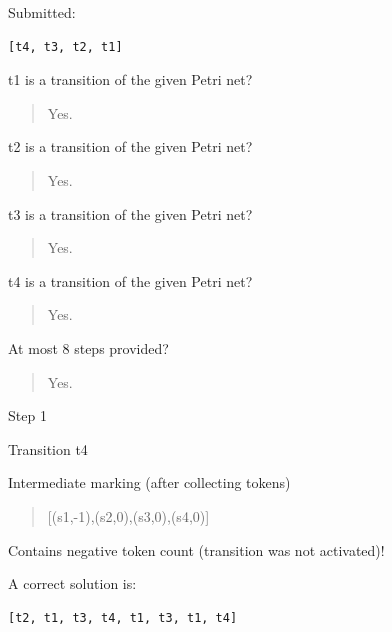 Submitted:


\begin{verbatim}
[t4, t3, t2, t1]
\end{verbatim}


t1 is a transition of the given Petri net?\begin{quote}Yes.\end{quote}t2 is a transition of the given Petri net?\begin{quote}Yes.\end{quote}t3 is a transition of the given Petri net?\begin{quote}Yes.\end{quote}t4 is a transition of the given Petri net?\begin{quote}Yes.\end{quote}At most 8 steps provided?\begin{quote}Yes.\end{quote}Step 1

 Transition t4 

Intermediate marking (after collecting tokens)

\begin{quote} [(s1,-1),(s2,0),(s3,0),(s4,0)] \end{quote}Contains negative token count (transition was not activated)!

A correct solution is:
\begin{verbatim}
[t2, t1, t3, t4, t1, t3, t1, t4]
\end{verbatim}


